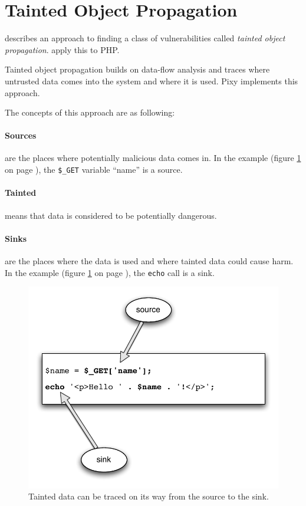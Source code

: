 \section{Tainted Object Propagation}
\label{tainting}
\cite{finding-security-vulnerabilities} describes an approach to finding a class of vulnerabilities called \emph{tainted object propagation}. \cite{pixy-short, pixy-long, pixy-dissertation} apply this to PHP.

Tainted object propagation builds on data-flow analysis and traces where untrusted data comes into the system and where it is used. Pixy implements this approach.

The concepts of this approach are as following:
\paragraph{Sources} are the places where potentially malicious data comes in. In the example (figure \ref{fig:taint} on page \pageref{fig:taint}), the \texttt{\$\_GET} variable ``name'' is a source.
\paragraph{Tainted} means that data is considered to be potentially dangerous.
\paragraph{Sinks} are the places where the data is used and where tainted data could cause harm. In the example (figure \ref{fig:taint} on page \pageref{fig:taint}), the \texttt{echo} call is a sink.

\begin{figure}[!h]
  \includegraphics[scale=0.8]{images/taint}
  \caption{Tainted data can be traced on its way from the source to the sink.}
  \label{fig:taint}
\end{figure}


